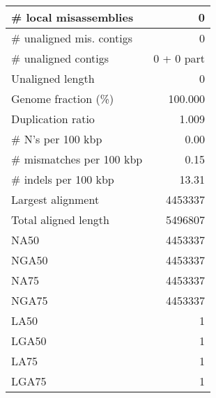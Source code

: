 \documentclass[12pt,a4paper]{article}
\begin{document}
\begin{table}[ht]
\begin{center}
\begin{tabular}{|l*{1}{|r}|}
\# local misassemblies & 0 \\ \hline
\# unaligned mis. contigs & 0 \\ \hline
\# unaligned contigs & 0 + 0 part \\ \hline
Unaligned length & 0 \\ \hline
Genome fraction (\%) & 100.000 \\ \hline
Duplication ratio & 1.009 \\ \hline
\# N's per 100 kbp & 0.00 \\ \hline
\# mismatches per 100 kbp & 0.15 \\ \hline
\# indels per 100 kbp & 13.31 \\ \hline
Largest alignment & 4453337 \\ \hline
Total aligned length & 5496807 \\ \hline
NA50 & 4453337 \\ \hline
NGA50 & 4453337 \\ \hline
NA75 & 4453337 \\ \hline
NGA75 & 4453337 \\ \hline
LA50 & 1 \\ \hline
LGA50 & 1 \\ \hline
LA75 & 1 \\ \hline
LGA75 & 1 \\ \hline
\end{tabular}
\end{center}
\end{table}
\end{document}

